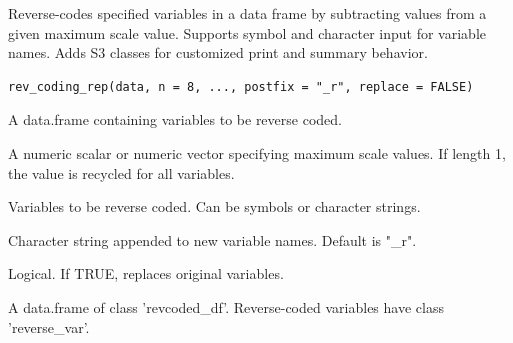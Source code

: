 \documentclass[a4paper]{book}
\begin{document}
%
\begin{Description}
Reverse-codes specified variables in a data frame by subtracting values
from a given maximum scale value. Supports symbol and character input
for variable names. Adds S3 classes for customized print and summary behavior.
\end{Description}
%
\begin{Usage}
\begin{verbatim}
rev_coding_rep(data, n = 8, ..., postfix = "_r", replace = FALSE)
\end{verbatim}
\end{Usage}
%
\begin{Arguments}
\begin{ldescription}
\item[\code{data}] A data.frame containing variables to be reverse coded.

\item[\code{n}] A numeric scalar or numeric vector specifying maximum scale values.
If length 1, the value is recycled for all variables.

\item[\code{...}] Variables to be reverse coded. Can be symbols or character strings.

\item[\code{postfix}] Character string appended to new variable names.
Default is "\_r".

\item[\code{replace}] Logical. If TRUE, replaces original variables.
\end{ldescription}
\end{Arguments}
%
\begin{Value}
A data.frame of class 'revcoded\_df'.
Reverse-coded variables have class 'reverse\_var'.
\end{Value}
%
\end{document}
